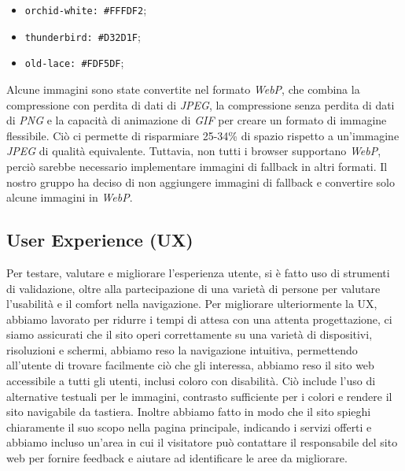 \documentclass[11pt]{article}
\begin{document}
\begin{itemize}
\item \texttt{orchid-white: \#FFFDF2};
\item \texttt{thunderbird: \#D32D1F};
\item \texttt{old-lace: \#FDF5DF};
\end{itemize}
Alcune immagini sono state convertite nel formato \emph{WebP}, che combina la compressione con perdita di dati di \emph{JPEG}, la compressione senza perdita di dati di \emph{PNG} e la capacità di animazione di \emph{GIF} per creare un formato di immagine flessibile. Ciò ci permette di risparmiare 25-34\% di spazio rispetto a un'immagine \emph{JPEG} di qualità equivalente. Tuttavia, non tutti i browser supportano \emph{WebP}, perciò sarebbe necessario implementare immagini di fallback in altri formati. Il nostro gruppo ha deciso di non aggiungere immagini di fallback e convertire solo alcune immagini in \emph{WebP}.
\subsection{User Experience (UX)}
\label{sec:org2b428c4}
Per testare, valutare e migliorare l'esperienza utente, si è fatto uso di strumenti di validazione, oltre alla partecipazione di una varietà di persone per valutare l'usabilità e il comfort nella navigazione. Per migliorare ulteriormente la UX, abbiamo lavorato per ridurre i tempi di attesa con una attenta progettazione, ci siamo assicurati che il sito operi correttamente su una varietà di dispositivi, risoluzioni e schermi, abbiamo reso la navigazione intuitiva, permettendo all'utente di trovare facilmente ciò che gli interessa, abbiamo reso il sito web accessibile a tutti gli utenti, inclusi coloro con disabilità. Ciò include l'uso di alternative testuali per le immagini, contrasto sufficiente per i colori e rendere il sito navigabile da tastiera. Inoltre abbiamo fatto in modo che il sito spieghi chiaramente il suo scopo nella pagina principale, indicando i servizi offerti e abbiamo incluso un'area in cui il visitatore può contattare il responsabile del sito web per fornire feedback e aiutare ad identificare le aree da migliorare.
\end{document}
